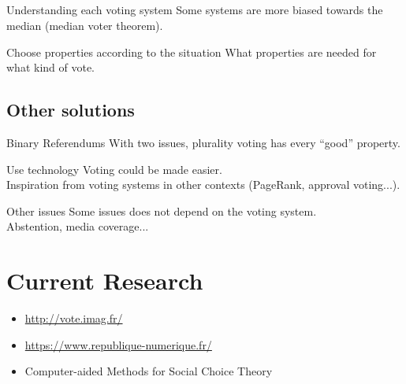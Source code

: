 \documentclass[utf8]{earlywinter}
\begin{document}
\subsection{ }
\begin{frame}{\secname}

  \begin{exampleblock}{Understanding each voting system}
    Some systems are more biased towards the median (median voter theorem).
  \end{exampleblock}
  \vfill
  \begin{exampleblock}{Choose properties according to the situation}
    What properties are needed for what kind of vote.
  \end{exampleblock}

\end{frame}

\subsection{Other solutions}
\begin{frame}{\subsecname}

  \begin{exampleblock}{Binary Referendums}
    With two issues, plurality voting has every ``good'' property.
  \end{exampleblock}
  \vill
  \begin{exampleblock}{Use technology}
    Voting could be made easier.\\
    Inspiration from voting systems in other contexts (PageRank, approval voting...).
  \end{exampleblock}
  \vill
  \begin{alertblock}{Other issues}
    Some issues does not depend on the voting system.\\
    Abstention, media coverage...
  \end{alertblock}

\end{frame}


\section{Current Research}
\begin{frame}{\secname}

  \begin{itemize}
  \item \url{http://vote.imag.fr/}
  \item \url{https://www.republique-numerique.fr/}
  \item Computer-aided Methods for Social Choice Theory
  \end{itemize}
\end{frame}
\end{document}
